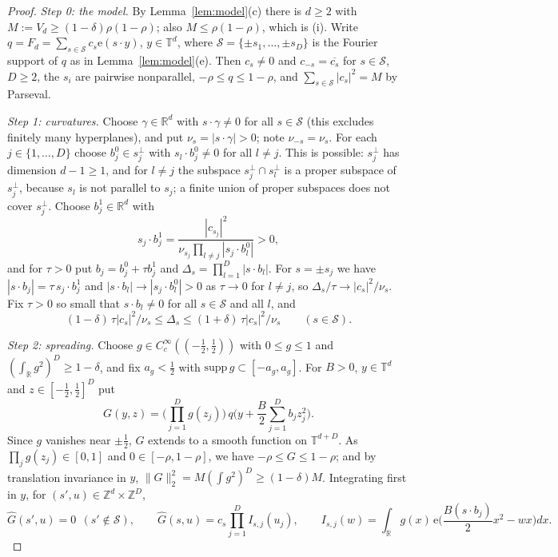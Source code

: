 \documentclass[11pt,reqno]{amsart}
\theoremstyle{definition}
\newcommand{\T}{\mathbb{T}}
\newcommand{\Z}{\mathbb{Z}}
\newcommand{\R}{\mathbb{R}}
\newcommand{\e}{\mathrm{e}}
\newcommand{\cS}{\mathcal{S}}
\begin{document}
\begin{proof}
\emph{Step 0: the model.} By Lemma~\ref{lem:model}(c) there is $d\ge2$ with $M:=V_d\ge(1-\delta)\rho(1-\rho)$; also $M\le\rho(1-\rho)$, which is (i). Write $q=F_d=\sum_{s\in\cS}c_s\e(s\cdot y)$, $y\in\T^d$, where $\cS=\{\pm s_1,\dots,\pm s_D\}$ is the Fourier support of $q$ as in Lemma~\ref{lem:model}(e). Then $c_s\ne0$ and $c_{-s}=\overline{c_s}$ for $s\in\cS$, $D\ge2$, the $s_i$ are pairwise nonparallel, $-\rho\le q\le1-\rho$, and $\sum_{s\in\cS}|c_s|^2=M$ by Parseval.

\emph{Step 1: curvatures.} Choose $\gamma\in\R^d$ with $s\cdot\gamma\ne0$ for all $s\in\cS$ (this excludes finitely many hyperplanes), and put $\nu_s=|s\cdot\gamma|>0$; note $\nu_{-s}=\nu_s$. For each $j\in\{1,\dots,D\}$ choose $b_j^0\in s_j^\perp$ with $s_l\cdot b_j^0\ne0$ for all $l\ne j$. This is possible: $s_j^\perp$ has dimension $d-1\ge1$, and for $l\ne j$ the subspace $s_j^\perp\cap s_l^\perp$ is a proper subspace of $s_j^\perp$, because $s_l$ is not parallel to $s_j$; a finite union of proper subspaces does not cover $s_j^\perp$. Choose $b_j^1\in\R^d$ with
\[
s_j\cdot b_j^1=\frac{|c_{s_j}|^2}{\nu_{s_j}\prod_{l\ne j}|s_j\cdot b_l^0|}>0,
\]
and for $\tau>0$ put $b_j=b_j^0+\tau b_j^1$ and $\Delta_s=\prod_{l=1}^D|s\cdot b_l|$. For $s=\pm s_j$ we have $|s\cdot b_j|=\tau\,s_j\cdot b_j^1$ and $|s\cdot b_l|\to|s_j\cdot b_l^0|>0$ as $\tau\to0$ for $l\ne j$, so $\Delta_s/\tau\to|c_s|^2/\nu_s$. Fix $\tau>0$ so small that $s\cdot b_l\ne0$ for all $s\in\cS$ and all $l$, and
\begin{equation}\label{eq:curv}
(1-\delta)\,\tau|c_s|^2/\nu_s\le\Delta_s\le(1+\delta)\,\tau|c_s|^2/\nu_s\qquad(s\in\cS).
\end{equation}

\emph{Step 2: spreading.} Choose $g\in C_c^\infty((-\frac12,\frac12))$ with $0\le g\le1$ and $(\int_\R g^2)^D\ge1-\delta$, and fix $a_g<\frac12$ with $\mathrm{supp}\,g\subset[-a_g,a_g]$. For $B>0$, $y\in\T^d$ and $z\in[-\frac12,\frac12]^D$ put
\[
G(y,z)=\Big(\prod_{j=1}^Dg(z_j)\Big)\,q\Big(y+\frac B2\sum_{j=1}^Db_jz_j^2\Big).
\]
Since $g$ vanishes near $\pm\frac12$, $G$ extends to a smooth function on $\T^{d+D}$. As $\prod_jg(z_j)\in[0,1]$ and $0\in[-\rho,1-\rho]$, we have $-\rho\le G\le1-\rho$; and by translation invariance in $y$, $\|G\|_2^2=M(\int g^2)^D\ge(1-\delta)M$. Integrating first in $y$, for $(s',u)\in\Z^d\times\Z^D$,
\begin{equation}\label{eq:Ghat}
\widehat G(s',u)=0\ \ (s'\notin\cS),\qquad\widehat G(s,u)=c_s\prod_{j=1}^DI_{s,j}(u_j),\qquad I_{s,j}(w)=\int_\R g(x)\,\e\Big(\frac{B(s\cdot b_j)}2x^2-wx\Big)dx .
\end{equation}


\end{proof}
\end{document}
